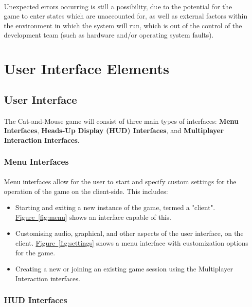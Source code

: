 \documentclass[12pt, titlepage]{article}
\begin{document}
\paragraph{}Unexpected errors occurring is still a possibility, due to the potential for the game to enter states which are unaccounted for, as well as external factors within the environment in which the system will run, which is out of the control of the development team (such as hardware and/or operating system faults).

\section{User Interface Elements}
\subsection{User Interface}
\paragraph{}The Cat-and-Mouse game will consist of three main types of interfaces: \textbf{Menu Interfaces}, \textbf{Heads-Up Display (HUD) Interfaces}, and \textbf{Multiplayer Interaction Interfaces}.
\subsubsection{Menu Interfaces}
\paragraph{} Menu interfaces allow for the user to start and specify custom settings for the operation of the game on the client-side. This includes:
\begin{itemize}
    \item Starting and exiting a new instance of the game, termed a "client". \hyperref[fig:menu]{Figure~\ref*{fig:menu}} shows an interface capable of this.
    \item Customising audio, graphical, and other aspects of the user interface, on the client. \hyperref[fig:settings]{Figure~\ref*{fig:settings}} shows a menu interface with customization options for the game.
    \item Creating a new or joining an existing game session using the Multiplayer Interaction interfaces. 
\end{itemize}  

\subsubsection{HUD Interfaces}
\end{document}
